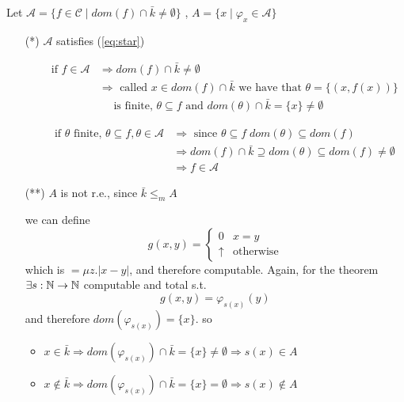 \begin{counterexample}
  Let
  $\mathcal{A} = \{ f \in \mathcal{C} \mid dom(f) \cap \bar{k} \neq
  \emptyset\}$ , $A = \{x \mid \varphi_x \in \mathcal{A}\}$

  \begin{enumerate}
  \item[(*)] $\mathcal{A}$ satisfies (\ref{eq:star})
    \begin{itemize}
    \item[] \[
        \begin{aligned}
          \mbox{if } f \in \mathcal{A} & \Rightarrow dom(f) \cap \bar{k} \neq \emptyset \\
                                       & \Rightarrow \mbox{ called } x \in dom(f) \cap \bar{k} \mbox{ we have that } \theta = \{(x, f(x))\} \\
                                       & \quad \mbox{ is finite, } \theta \subseteq f \mbox{ and } dom(\theta)\cap \bar{k} = \{x\} \neq \emptyset
        \end{aligned}
      \]

    \item[] \[
        \begin{aligned}
          \mbox{if $\theta$ finite, } \theta \subseteq f, \theta \in \mathcal{A} & \Rightarrow \mbox{ since } \theta \subseteq f \; dom(\theta) \subseteq dom(f) \\
          & \Rightarrow dom(f) \cap \bar{k} \supseteq dom(\theta) \subseteq dom(f) \neq \emptyset \\
          & \Rightarrow f \in \mathcal{A}
        \end{aligned}
      \]
    \end{itemize}

  \item[(**)] $A$ is not r.e., since $\bar{k} \leq_m A$

    we can define
    \[
      g(x,y) = \begin{cases}
        0        & x=y \\
        \uparrow & \mbox{otherwise}
      \end{cases}
    \]
    which is $= \mu z . |x-y|$, and therefore computable. Again,
    for the \smn theorem $\exists s : \mathbb{N} \to \mathbb{N}$ computable and total
    s.t.
    \[
      g(x,y) = \varphi_{s(x)}(y)
    \]
    and therefore $dom(\varphi_{s(x)}) = \{x\}$. so
    \begin{itemize}
    \item
      \(x \in \bar{k} \Rightarrow dom(\varphi_{s(x)}) \cap \bar{k} =
      \{x\} \neq \emptyset \Rightarrow s(x) \in A\)
    \item
      \(x \notin \bar{k} \Rightarrow dom(\varphi_{s(x)}) \cap \bar{k}
      = \{x\} = \emptyset \Rightarrow s(x) \notin A\)
    \end{itemize}
  \end{enumerate}
\end{counterexample}
